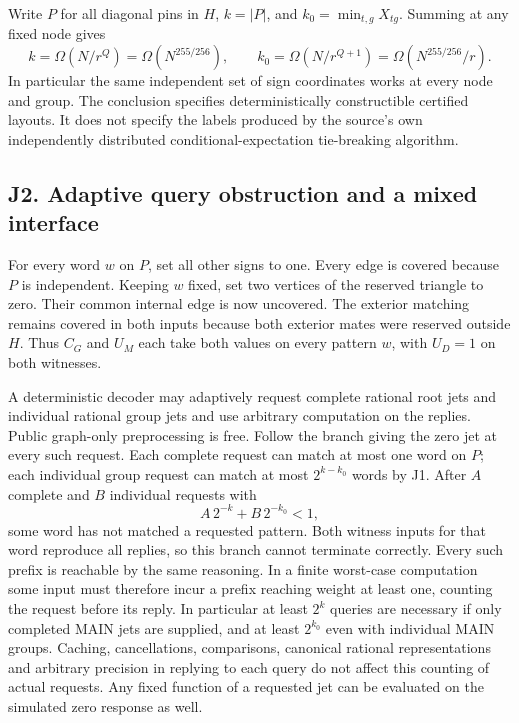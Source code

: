 \documentclass[
  11pt,
]{article}
\begin{document}
Write \(P\) for all diagonal pins in \(H\), \(k=|P|\), and
\(k_0=\min_{t,g}X_{tg}\). Summing at any fixed node gives \[
   k=\Omega(N/r^Q)=\Omega(N^{255/256}),\qquad
   k_0=\Omega(N/r^{Q+1})=\Omega(N^{255/256}/r).
\] In particular the same independent set of sign coordinates works at
every node and group. The conclusion specifies deterministically
constructible certified layouts. It does not specify the labels produced
by the source's own independently distributed conditional-expectation
tie-breaking algorithm.

\subsection{J2. Adaptive query obstruction and a mixed
interface}\label{v9-j2-adaptive-query-obstruction-and-a-mixed-interface}

For every word \(w\) on \(P\), set all other signs to one. Every edge is
covered because \(P\) is independent. Keeping \(w\) fixed, set two
vertices of the reserved triangle to zero. Their common internal edge is
now uncovered. The exterior matching remains covered in both inputs
because both exterior mates were reserved outside \(H\). Thus \(C_G\)
and \(U_M\) each take both values on every pattern \(w\), with \(U_D=1\)
on both witnesses.

A deterministic decoder may adaptively request complete rational root
jets and individual rational group jets and use arbitrary computation on
the replies. Public graph-only preprocessing is free. Follow the branch
giving the zero jet at every such request. Each complete request can
match at most one word on \(P\); each individual group request can match
at most \(2^{k-k_0}\) words by J1. After \(A\) complete and \(B\)
individual requests with \[
                        A\,2^{-k}+B\,2^{-k_0}<1,                 \tag{Q1}
\] some word has not matched a requested pattern. Both witness inputs
for that word reproduce all replies, so this branch cannot terminate
correctly. Every such prefix is reachable by the same reasoning. In a
finite worst-case computation some input must therefore incur a prefix
reaching weight at least one, counting the request before its reply. In
particular at least \(2^k\) queries are necessary if only completed MAIN
jets are supplied, and at least \(2^{k_0}\) even with individual MAIN
groups. Caching, cancellations, comparisons, canonical rational
representations and arbitrary precision in replying to each query do not
affect this counting of actual requests. Any fixed function of a
requested jet can be evaluated on the simulated zero response as well.
\end{document}
